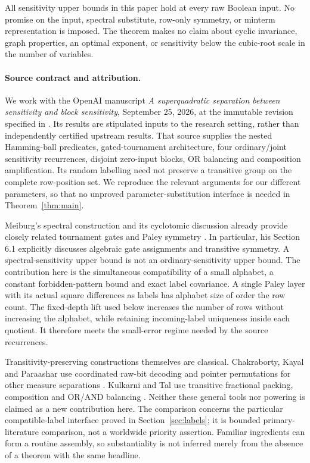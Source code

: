 \documentclass[11pt]{article}
\theoremstyle{definition}
\begin{document}
All sensitivity upper bounds in this paper hold at every raw Boolean input. No promise on the input, spectral substitute, row-only symmetry, or minterm representation is imposed. The theorem makes no claim about cyclic invariance, graph properties, an optimal exponent, or sensitivity below the cubic-root scale in the number of variables.

\paragraph{Source contract and attribution.}
We work with the OpenAI manuscript \emph{A superquadratic separation between sensitivity and block sensitivity}, September 25, 2026, at the immutable revision specified in \cite{OpenAI}. Its results are stipulated inputs to the research setting, rather than independently certified upstream results. That source supplies the nested Hamming-ball predicates, gated-tournament architecture, four ordinary/joint sensitivity recurrences, disjoint zero-input blocks, OR balancing and composition amplification. Its random labelling need not preserve a transitive group on the complete row-position set. We reproduce the relevant arguments for our different parameters, so that no unproved parameter-substitution interface is needed in Theorem~\ref{thm:main}.

Meiburg's spectral construction and its cyclotomic discussion already provide closely related tournament gates and Paley symmetry \cite[Sections 3--6]{Meiburg}. In particular, his Section 6.1 explicitly discusses algebraic gate assignments and transitive symmetry. A spectral-sensitivity upper bound is not an ordinary-sensitivity upper bound. The contribution here is the simultaneous compatibility of a small alphabet, a constant forbidden-pattern bound and exact label covariance. A single Paley layer with its actual square differences as labels has alphabet size of order the row count. The fixed-depth lift used below increases the number of rows without increasing the alphabet, while retaining incoming-label uniqueness inside each quotient. It therefore meets the small-error regime needed by the source recurrences.

Transitivity-preserving constructions themselves are classical. Chakraborty, Kayal and Paraashar use coordinated raw-bit decoding and pointer permutations for other measure separations \cite{CKP}. Kulkarni and Tal use transitive fractional packing, composition and OR/AND balancing \cite[Section 4]{KT}. Neither these general tools nor powering is claimed as a new contribution here. The comparison concerns the particular compatible-label interface proved in Section~\ref{sec:labels}; it is bounded primary-literature comparison, not a worldwide priority assertion. Familiar ingredients can form a routine assembly, so substantiality is not inferred merely from the absence of a theorem with the same headline.
\end{document}
